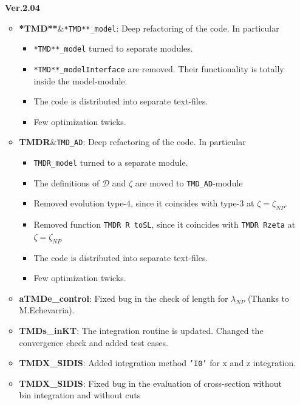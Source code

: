 \documentclass[prd,nofootinbib,eqsecnum,final]{revtex4}
\renewcommand{\(}{\left(}
\renewcommand{\)}{\right)}
\renewcommand{\[}{\left[}
\renewcommand{\]}{\right]}
\begin{document}
\begin{itemize}
\item[\textbf{Ver.2.04}]
\begin{itemize}	
	\item \textbf{*TMD**}\&\texttt{*TMD**\_model}: Deep refactoring of the code. In particular
	\begin{itemize}
			\item \texttt{*TMD**\_model} turned to separate modules.
			\item \texttt{*TMD**\_modelInterface} are removed. Their functionality is totally inside the model-module.
			\item The code is distributed into separate text-files.
			\item Few optimization twicks.
	\end{itemize}
	\item \textbf{TMDR}\&\texttt{TMD\_AD}: Deep refactoring of the code. In particular
	\begin{itemize}
			\item \texttt{TMDR\_model} turned to a separate module.
			\item The definitions of $\mathcal{D}$ and $\zeta$ are moved to \texttt{TMD\_AD}-module
			\item Removed evolution type-4, since it coincides with type-3 at $\zeta=\zeta_{NP}$.
			\item Removed function \texttt{TMDR R toSL}, since it coincides with \texttt{TMDR Rzeta} at $\zeta=\zeta_{NP}$
			\item The code is distributed into separate text-files.
			\item Few optimization twicks.
	\end{itemize}
	\item \textbf{aTMDe\_control}: Fixed bug in the check of length for $\lambda_{NP}$ (Thanks to M.Echevarria).
	\item \textbf{TMDs\_inKT}: The integration routine is updated. Changed the convergence check and added test cases.
	\item \textbf{TMDX\_SIDIS}: Added integration method \texttt{'I0'} for x and  z integration.
	\item \textbf{TMDX\_SIDIS}: Fixed bug in the evaluation of cross-section without bin integration and without cuts
\end{itemize}


\end{itemize}
\end{document}
